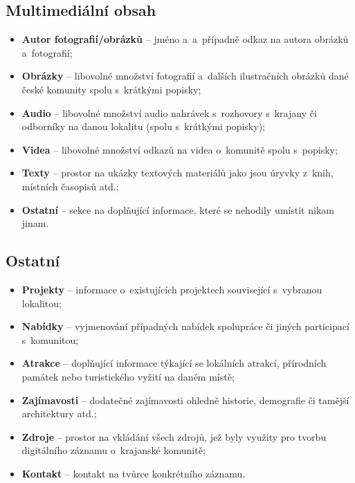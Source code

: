 \hypertarget{multimediuxe1lnuxed-obsah}{%
\subsection{Multimediální obsah}\label{multimediuxe1lnuxed-obsah}}

\begin{itemize}
\tightlist
\item
  \textbf{Autor fotografií/obrázků} -- jméno a~a~případně odkaz na autora obrázků a~fotografií;
\item
  \textbf{Obrázky} -- libovolné množství fotografií a~dalších ilustračních obrázků dané české komunity spolu s~krátkými popisky;
\item
  \textbf{Audio} -- libovolné množství audio nahrávek s~rozhovory s~krajany či odborníky na danou lokalitu (spolu s~krátkými popisky);
\item
  \textbf{Videa} -- libovolné množství odkazů na videa o~komunitě spolu s~popisky;
\item
  \textbf{Texty} -- prostor na ukázky textových materiálů jako jsou úryvky z~knih, místních časopisů atd.;
\item
  \textbf{Ostatní} -- sekce na doplňující informace, které se nehodily umístit nikam jinam.
\end{itemize}

\hypertarget{ostatnuxed}{%
\subsection{Ostatní}\label{ostatnuxed}}

\begin{itemize}
\tightlist
\item
  \textbf{Projekty} -- informace o~existujících projektech související s~vybranou lokalitou;
\item
  \textbf{Nabídky} -- vyjmenování případných nabídek spolupráce či jiných participací s~komunitou;
\item
  \textbf{Atrakce} -- doplňující informace týkající se lokálních atrakcí, přírodních památek nebo turistického vyžití na daném místě;
\item
  \textbf{Zajímavosti} -- dodatečné zajímavosti ohledně historie, demografie či tamější architektury atd.;
\item
  \textbf{Zdroje} -- prostor na vkládání všech zdrojů, jež byly využity pro tvorbu digitálního záznamu o~krajanské komunitě;
\item
  \textbf{Kontakt} -- kontakt na tvůrce konkrétního záznamu.
\end{itemize}

